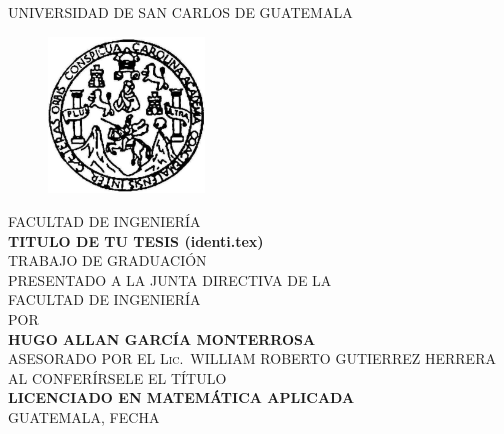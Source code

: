
\thispagestyle{empty}

\begin{center}
UNIVERSIDAD DE SAN CARLOS DE GUATEMALA
\end{center}

\begin{figure}[h]
  \begin{center}
    \includegraphics[width=4.15cm]{escudo}\\
  \end{center}
\end{figure}

\begin{center}
\vspace{-7.5mm}FACULTAD DE INGENIERÍA\\[1.5cm]

\textbf{TITULO DE TU TESIS (identi.tex)}\\[1.15cm]

TRABAJO DE GRADUACIÓN \\ PRESENTADO A LA JUNTA DIRECTIVA DE LA \\
FACULTAD DE INGENIERÍA
\\POR \\[1.15cm]
\textbf{HUGO ALLAN GARCÍA MONTERROSA} \\
ASESORADO POR EL \textsc{Lic.}~WILLIAM ROBERTO GUTIERREZ HERRERA \\[1cm]
AL CONFERÍRSELE EL TÍTULO\\
\textbf{LICENCIADO EN MATEMÁTICA APLICADA}\\[2.5cm]
GUATEMALA, FECHA

\end{center}
